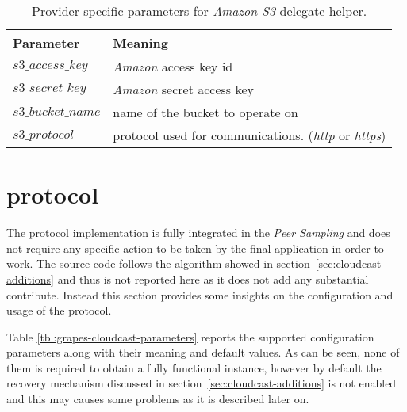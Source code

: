 \begin{table}[H]
  \centering
  \begin{tabular}{|l|l|}
  \hline
  Parameter & Meaning \\
  \hline
  \hline
  $s3\_access\_key$ & \textit{Amazon} access key id \\
  $s3\_secret\_key$ & \textit{Amazon} secret access key \\
  $s3\_bucket\_name$ & name of the bucket to operate on \\
  $s3\_protocol$ & protocol used for communications. (\emph{http}  or
  \emph{https}) \\
  \hline
  \end{tabular}
  \caption{Provider specific parameters for \textit{Amazon S3} delegate helper.}
  \label{tbl:grapes-cloudhelper-libs3}
\end{table}

\section{\cloudcast \peersampling protocol}
The \cloudcast \peersampling protocol implementation is fully
integrated in the \grapes \textit{Peer Sampling} \api and does not
require any specific action to be taken by the final application in
order to work. The source code follows the algorithm showed in
section~\ref{sec:cloudcast-additions} and thus is not reported
here as it does not add any substantial contribute. Instead this
section provides some insights on the configuration and usage of the
protocol.

Table \ref{tbl:grapes-cloudcast-parameters} reports the supported
configuration parameters along with their meaning and default
values. As can be seen, none of them is required to obtain a fully
functional instance, however by default the recovery mechanism
discussed in section~\ref{sec:cloudcast-additions} is not enabled
and this may causes some problems as it is described later on.

